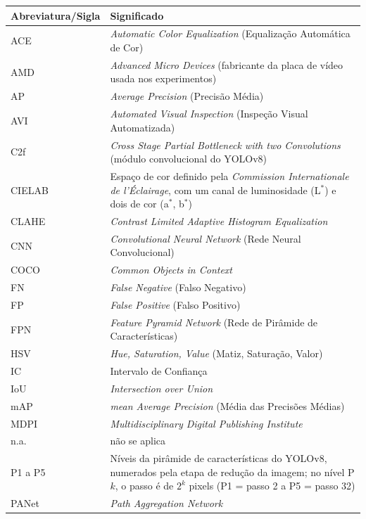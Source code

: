\documentclass[
    12pt,                %
    openright,           %
    oneside,             %
    a4paper,             %
    english,             %
    brazil               %
]{abntex2}
\begin{document}
\begin{longtable}{@{}>{\raggedright\arraybackslash}p{3.8cm}>{\raggedright\arraybackslash}p{\dimexpr\textwidth-3.8cm-2\tabcolsep\relax}@{}}
\toprule
\textbf{Abreviatura/Sigla} & \textbf{Significado} \\
\midrule
\endhead
\bottomrule
\endlastfoot
ACE    & \textit{Automatic Color Equalization} (Equalização Automática de Cor) \\
AMD    & \textit{Advanced Micro Devices} (fabricante da placa de vídeo usada nos experimentos) \\
AP     & \textit{Average Precision} (Precisão Média) \\
AVI    & \textit{Automated Visual Inspection} (Inspeção Visual Automatizada) \\
C2f    & \textit{Cross Stage Partial Bottleneck with two Convolutions} (módulo convolucional do YOLOv8) \\
CIELAB & Espaço de cor definido pela \textit{Commission Internationale de l'Éclairage}, com um canal de luminosidade (L$^*$) e dois de cor (a$^*$, b$^*$) \\
CLAHE  & \textit{Contrast Limited Adaptive Histogram Equalization} \\
CNN    & \textit{Convolutional Neural Network} (Rede Neural Convolucional) \\
COCO   & \textit{Common Objects in Context} \\
FN     & \textit{False Negative} (Falso Negativo) \\
FP     & \textit{False Positive} (Falso Positivo) \\
FPN    & \textit{Feature Pyramid Network} (Rede de Pirâmide de Características) \\
HSV    & \textit{Hue, Saturation, Value} (Matiz, Saturação, Valor) \\
IC     & Intervalo de Confiança \\
IoU    & \textit{Intersection over Union} \\
mAP    & \textit{mean Average Precision} (Média das Precisões Médias) \\
MDPI   & \textit{Multidisciplinary Digital Publishing Institute} \\
n.a.   & não se aplica \\
P1 a P5 & Níveis da pirâmide de características do YOLOv8, numerados pela etapa de redução da imagem; no nível P$k$, o passo é de $2^k$ pixels (P1 = passo 2 a P5 = passo 32) \\
PANet  & \textit{Path Aggregation Network} \\

\end{longtable}
\end{document}
